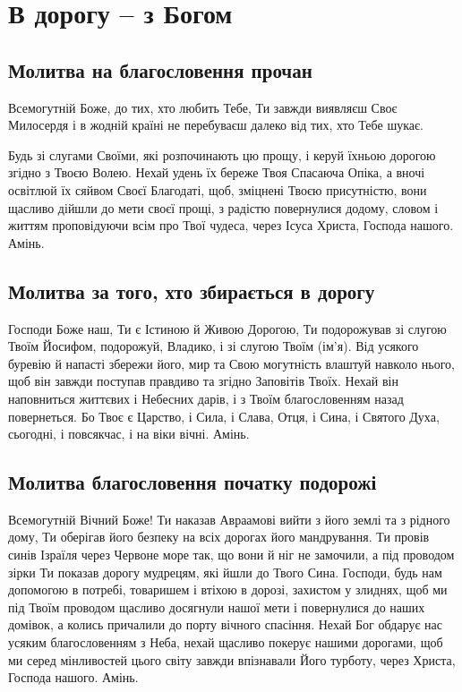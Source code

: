 \documentclass[chapters.tex]{subfiles}
\begin{document}
\chapter{В дорогу -- з Богом}
\section{Молитва на благословення прочан}
Всемогутній Боже, до тих, хто любить Тебе, Ти завжди виявляєш Своє Милосердя і в жодній країні не перебуваєш далеко від тих, хто Тебе шукає.

Будь зі слугами Своїми, які розпочинають цю прощу, і керуй їхньою дорогою згідно з Твоєю Волею. Нехай удень їх береже Твоя Спасаюча Опіка, а вночі освітлюй їх сяйвом Своєї Благодаті, щоб, зміцнені Твоєю присутністю, вони щасливо дійшли до мети своєї прощі, з радістю повернулися додому, словом і життям проповідуючи всім про Твої чудеса, через Ісуса Христа, Господа нашого. Амінь.

\section{Молитва за того, хто збирається в дорогу}
Господи Боже наш, Ти є Істиною й Живою Дорогою, Ти подорожував зі слугою Твоїм Йосифом, подорожуй, Владико, і зі слугою Твоїм (ім’я). Від усякого буревію й напасті збережи його, мир та Свою могутність влаштуй навколо нього, щоб він завжди поступав правдиво та згідно Заповітів Твоїх. Нехай він наповниться життєвих і Небесних дарів, і з Твоїм благословенням назад повернеться. Бо Твоє є Царство, і Сила, і Слава, Отця, і Сина, і Святого Духа, сьогодні, і повсякчас, і на віки вічні. Амінь.

\section{Молитва благословення початку подорожі}
Всемогутній Вічний Боже! Ти наказав Авраамові вийти з його землі та з рідного дому, Ти оберігав його безпеку на всіх дорогах його мандрування. Ти провів синів Ізраїля через Червоне море так, що вони й ніг не замочили, а під проводом зірки Ти показав дорогу мудрецям, які йшли до Твого Сина. Господи, будь нам допомогою в потребі, товаришем і втіхою в дорозі, захистом у злиднях, щоб ми під Твоїм проводом щасливо досягнули нашої мети і повернулися до наших домівок, а колись причалили до порту вічного спасіння. Нехай Бог обдарує нас усяким благословенням з Неба, нехай щасливо покерує нашими дорогами, щоб ми серед мінливостей цього світу завжди впізнавали Його турботу, через Христа, Господа нашого. Амінь.
\end{document}
